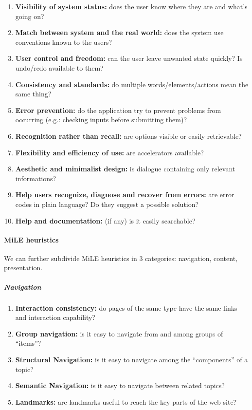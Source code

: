 \begin{enumerate}[start=1,label={-- \bf H\arabic{*}}]
    \item \textbf{Visibility of system status:} does the user know where they are and    
          what's going on?
    \item \textbf{Match between system and the real world:} does the system use 
          conventions known to the users?
    \item \textbf{User control and freedom:} can the user leave unwanted state quickly? 
          Is undo/redo available to them?
    \item \textbf{Consistency and standards:} do multiple words/elements/actions mean    
          the same thing?
    \item \textbf{Error prevention:} do the application try to prevent problems 
          from occurring (e.g.: checking inputs before submitting them)?
    \item \textbf{Recognition rather than recall:} are options visible or easily 
          retrievable?
    \item \textbf{Flexibility and efficiency of use:} are accelerators available?
    \item \textbf{Aesthetic and minimalist design:} is dialogue containing only relevant 
          informations?
    \item \textbf{Help users recognize, diagnose and recover from errors:} are error 
          codes in plain language? Do they suggest a possible solution?
    \item \textbf{Help and documentation:} (if any) is it easily searchable?
\end{enumerate}

\paragraph*{MiLE heuristics}

We can further subdivide MiLE heuristics in 3 categories: navigation, content, presentation.

\subparagraph*{Navigation}

\begin{enumerate}[start=1,label={-- \bf MN\arabic{*}}]
    \item \textbf{Interaction consistency:} do pages of the same type have the same links
          and interaction capability?
    \item \textbf{Group navigation:} is it easy to navigate from and among groups of
          ``items''?
    \item \textbf{Structural Navigation:} is it easy to navigate among the ``components'' of a topic?
    \item \textbf{Semantic Navigation:} is it easy to navigate between related topics?
    \item \textbf{Landmarks:} are landmarks useful to reach the key parts of the web
          site?
\end{enumerate}

